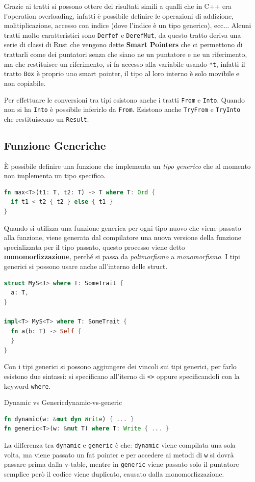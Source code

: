 \documentclass[12pt]{article}
\begin{document}
Grazie ai tratti si possono ottere dei risultati simili a qualli che in C++ era l'operation overloading, infatti \`e possibile definire le operazioni di addizione, molitiplicazione, accesso con indice (dove l'indice \`e un tipo generico), ecc... Alcuni tratti molto caratteristici sono \texttt{Derfef} e \texttt{DerefMut}, da questo tratto deriva una serie di classi di Rust che vengono dette \textbf{Smart Pointers} che ci permettono di trattarli come dei puntatori senza che siano ne un puntatore e ne un riferimento, ma che restituisce un riferimento, si fa accesso alla variabile usando \texttt{*t}, infatti il tratto \texttt{Box} \`e proprio uno smart pointer, il tipo al loro interno \`e solo movibile e non copiabile.

Per effettuare le conversioni tra tipi esistono anche i tratti \texttt{From} e \texttt{Into}. Quando non si ha \texttt{Into} \`e possibile inferirlo da \texttt{From}. Esistono anche \texttt{TryFrom} e \texttt{TryInto} che restituiscono un \texttt{Result}.


\subsection{Funzione Generiche}
\`E possibile definire una funzione che implementa un \emph{tipo generico} che al momento non implementa un tipo specifico.
\begin{lstlisting}[language=rust]
fn max<T>(t1: T, t2: T) -> T where T: Ord {
  if t1 < t2 { t2 } else { t1 }
}
\end{lstlisting}
Quando si utilizza una funzione generica per ogni tipo nuovo che viene passato alla funzione, viene generata dal compilatore una nuova versione della funzione specializzata per il tipo passato, questo processo viene detto \textbf{monomorfizzazione}, perch\'e si passa da \emph{polimorfismo} a \emph{monomorfismo}. I tipi generici si possono usare anche all'interno delle struct.
\begin{lstlisting}[language=rust]
struct MyS<T> where T: SomeTrait {
  a: T,
}

impl<T> MyS<T> where T: SomeTrait {
  fn a(b: T) -> Self {
  }
}
\end{lstlisting}
Con i tipi generici si possono aggiungere dei vincoli sui tipi generici, per farlo esistono due sintassi: si specificano all'iterno di \texttt{<>} oppure specificandoli con la keyword \texttt{where}.
\begin{example}{Dynamic vs Generic}{dynamic-vs-generic}
  \begin{lstlisting}[language=rust]
fn dynamic(w: &mut dyn Write) { ... }
fn generic<T>(w: &mut T) where T: Write { ... }
  \end{lstlisting}
  La differenza tra \texttt{dynamic} e \texttt{generic} \`e che: \texttt{dynamic} viene compilata una sola volta, ma viene passato un fat pointer e per accedere ai metodi di \texttt{w} si dovr\`a passare prima dalla v-table, mentre in \texttt{generic} viene passato solo il puntatore semplice per\`o il codice viene duplicato, causato dalla monomorfizzazione.
\end{example}
\end{document}

